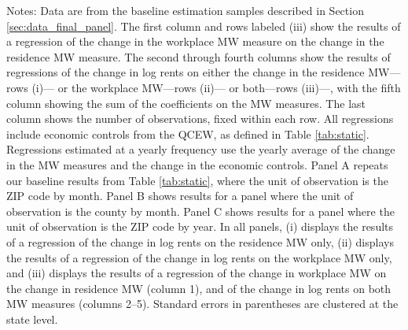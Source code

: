 \begin{landscape}
\begin{table}[ht!]
    \begin{minipage}{.95\linewidth} \footnotesize
        \vspace{2mm}
        Notes:
        Data are from the baseline estimation samples described in Section 
        \ref{sec:data_final_panel}.
        The first column and rows labeled (iii) show the results of a regression 
        of the change in the workplace MW measure on the change in the 
        residence MW measure.
        The second through fourth columns show the results of regressions of the 
        change in log rents on either the change in the residence MW---rows (i)---
        or the workplace MW---rows (ii)--- 
        or both---rows (iii)---, with the fifth column showing the sum of the 
        coefficients on the MW measures.
        The last column shows the number of observations, fixed within each row.
        All regressions include economic controls from the QCEW, as defined in
        Table \ref{tab:static}.
        Regressions estimated at a yearly frequency use the yearly average of
        the change in the MW measures and the change in the economic controls.
        Panel A repeats our baseline results from Table \ref{tab:static}, where 
        the unit of observation is the ZIP code by month.
        Panel B shows results for a panel where the unit of observation is the 
        county by month.
        Panel C shows results for a panel where the unit of observation is the 
        ZIP code by year.
        In all panels,
        (i) displays the results of a regression of the change in log rents on 
        the residence MW only,
        (ii) displays the results of a regression of the change in log 
        rents on the workplace MW only, and
        (iii) displays the results of a regression of the change in workplace
        MW on the change in residence MW (column 1), and of the change in 
        log rents on both MW measures (columns 2--5).
        Standard errors in parentheses are clustered at the state level.
    \end{minipage}
\end{table}
\end{landscape}
